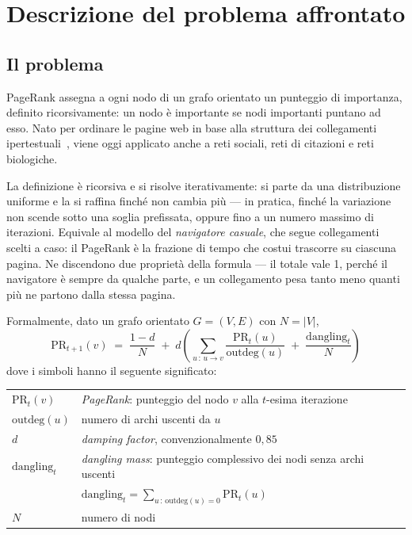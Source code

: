 \documentclass[11pt,a4paper]{article}
\begin{document}
\tableofcontents
\newpage

\section{Descrizione del problema affrontato}

\subsection{Il problema}
PageRank assegna a ogni nodo di un grafo orientato un punteggio di
importanza, definito ricorsivamente: un nodo è importante se nodi
importanti puntano ad esso. Nato per ordinare le pagine web in base alla
struttura dei collegamenti ipertestuali~\cite{page1999}, viene oggi
applicato anche a reti sociali, reti di citazioni e reti biologiche.

La definizione è ricorsiva e si risolve iterativamente: si parte da una
distribuzione uniforme e la si raffina finché non cambia più --- in
pratica, finché la variazione non scende sotto una soglia prefissata,
oppure fino a un numero massimo di iterazioni. Equivale al
modello del \emph{navigatore casuale}, che segue collegamenti scelti a caso:
il PageRank è la frazione di tempo che costui trascorre su ciascuna pagina.
Ne discendono due proprietà della formula --- il totale vale 1, perché il
navigatore è sempre da qualche parte, e un collegamento pesa tanto meno
quanti più ne partono dalla stessa pagina.

Formalmente, dato un grafo orientato $G=(V,E)$ con $N=|V|$,
\begin{equation}
\mathrm{PR}_{t+1}(v) \;=\; \frac{1-d}{N}
\;+\; d\left( \sum_{u \,:\, u \to v} \frac{\mathrm{PR}_t(u)}{\mathrm{outdeg}(u)}
\;+\; \frac{\mathrm{dangling}_t}{N} \right)
\label{eq:pagerank}
\end{equation}
dove i simboli hanno il seguente significato:
\begin{center}
\begin{tabular}{@{}ll@{}}
\toprule
$\mathrm{PR}_t(v)$ & \emph{PageRank}: punteggio del nodo $v$ alla $t$-esima iterazione \\
$\mathrm{outdeg}(u)$ & numero di archi uscenti da $u$ \\
$d$ & \emph{damping factor}, convenzionalmente $0{,}85$ \\
$\mathrm{dangling}_t$ & \emph{dangling mass}: punteggio complessivo dei nodi senza archi uscenti \\
 & $\mathrm{dangling}_t=\sum_{u\,:\,\mathrm{outdeg}(u)=0}\mathrm{PR}_t(u)$ \\
$N$ & numero di nodi \\
\bottomrule
\end{tabular}
\end{center}
\end{document}
